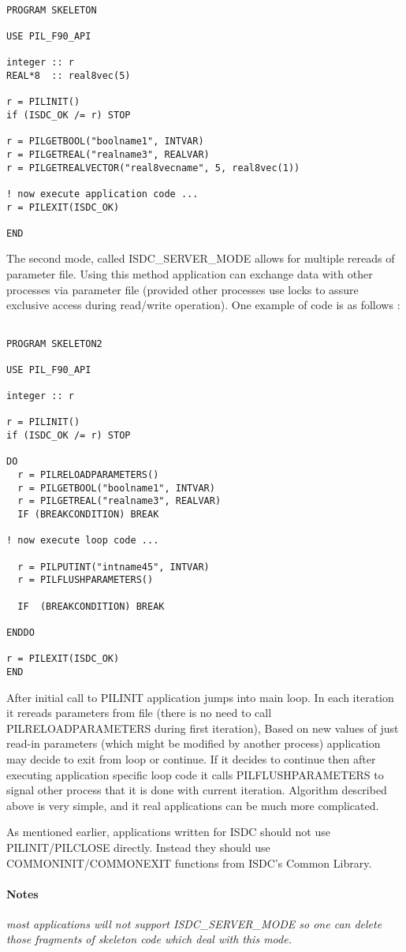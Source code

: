 \begin{verbatim}

PROGRAM SKELETON

USE PIL_F90_API

integer :: r
REAL*8  :: real8vec(5)

r = PILINIT()
if (ISDC_OK /= r) STOP

r = PILGETBOOL("boolname1", INTVAR)
r = PILGETREAL("realname3", REALVAR)
r = PILGETREALVECTOR("real8vecname", 5, real8vec(1))

! now execute application code ...
r = PILEXIT(ISDC_OK)

END

\end{verbatim}

The second mode, called ISDC\_SERVER\_MODE allows for multiple rereads of
parameter file. Using this method
application can exchange data with other processes via parameter file
(provided other processes use locks to
assure exclusive access during read/write operation). One example of code is
as follows : 
  
  
\begin{verbatim}

PROGRAM SKELETON2

USE PIL_F90_API

integer :: r

r = PILINIT()
if (ISDC_OK /= r) STOP

DO
  r = PILRELOADPARAMETERS()
  r = PILGETBOOL("boolname1", INTVAR)
  r = PILGETREAL("realname3", REALVAR)
  IF (BREAKCONDITION) BREAK

! now execute loop code ...

  r = PILPUTINT("intname45", INTVAR)
  r = PILFLUSHPARAMETERS()

  IF  (BREAKCONDITION) BREAK

ENDDO

r = PILEXIT(ISDC_OK)
END

\end{verbatim}

After initial call to PILINIT application jumps into main loop. In each
iteration it rereads parameters from file
(there is no need to call PILRELOADPARAMETERS during first iteration), Based
on new values of just read-in
parameters (which might be modified by another process) application may
decide to exit from loop or continue.
If it decides to continue then after executing application specific loop
code it calls PILFLUSHPARAMETERS to
signal other process that it is done with current iteration. Algorithm
described above is very simple, and it real
applications can be much more complicated. 

As mentioned earlier, applications written for ISDC should not use
PILINIT/PILCLOSE directly. Instead they
should use COMMONINIT/COMMONEXIT functions from ISDC's Common Library. 

\paragraph{Notes\\}
{\it
most applications will not support ISDC\_SERVER\_MODE so one can delete
those fragments of skeleton code which deal with this mode. 
}
